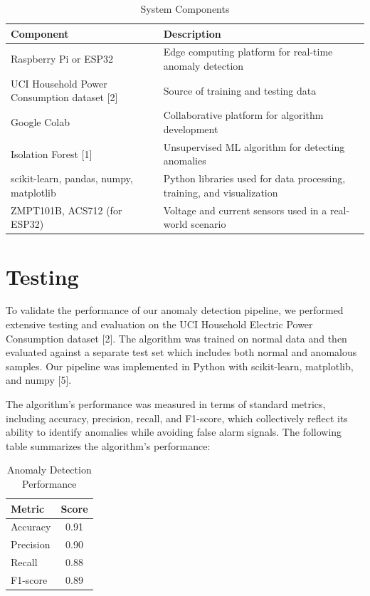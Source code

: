 \documentclass[12pt, draftclsnofoot, onecolumn]{IEEEtran}
\begin{document}
\begin{table}[h!]
	\centering
	\caption{System Components}
	\label{table:system-components}
	\begin{tabular}{|l|p{7cm}|}
		\hline
		\textbf{Component} & \textbf{Description} \\ 
		\hline
		Raspberry Pi or ESP32 & Edge computing platform for real-time anomaly detection \\ 
		\hline
		UCI Household Power Consumption dataset [2] & Source of training and testing data \\ 
		\hline
		Google Colab & Collaborative platform for algorithm development \\ 
		\hline
		Isolation Forest [1] & Unsupervised ML algorithm for detecting anomalies \\ 
		\hline
		scikit-learn, pandas, numpy, matplotlib & Python libraries used for data processing, training, and visualization \\ 
		\hline
		ZMPT101B, ACS712 (for ESP32) & Voltage and current sensors used in a real-world scenario \\ 
		\hline
	\end{tabular}
\end{table}


\section{Testing}
To validate the performance of our anomaly detection pipeline, we performed extensive testing and evaluation on the UCI Household Electric Power Consumption dataset [2]. The algorithm was trained on normal data and then evaluated against a separate test set which includes both normal and anomalous samples. Our pipeline was implemented in Python with scikit-learn, matplotlib, and numpy [5].

The algorithm’s performance was measured in terms of standard metrics, including accuracy, precision, recall, and F1-score, which collectively reflect its ability to identify anomalies while avoiding false alarm signals. The following table summarizes the algorithm’s performance:

\setlength{\arraystretch}{1.5}

\begin{table}[h!]
	\centering
	\caption{Anomaly Detection Performance}
	\label{table:testing}
	\begin{tabular}{|l|c|}
		\hline
		\textbf{Metric} & \textbf{Score} \\ 
		\hline
		Accuracy & 0.91 \\ 
		\hline
		Precision & 0.90 \\ 
		\hline
		Recall & 0.88 \\ 
		\hline
		F1-score & 0.89 \\ 
		\hline
	\end{tabular}
\end{table}
\end{document}
